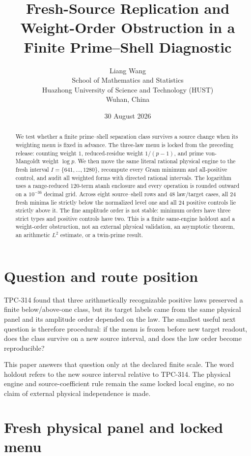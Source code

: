 \documentclass[10pt,a4paper]{article}
\title{Fresh-Source Replication and Weight-Order Obstruction in a Finite Prime--Shell Diagnostic}
\author{Liang Wang\\
School of Mathematics and Statistics\\
Huazhong University of Science and Technology (HUST)\\
Wuhan, China}
\date{30 August 2026}
\begin{document}
\maketitle

\begin{abstract}
We test whether a finite prime--shell separation class survives a source
change when its weighting menu is fixed in advance.  The three-law menu is
locked from the preceding release: counting weight $1$, reduced-residue
weight $1/(p-1)$, and prime von-Mangoldt weight $\log p$.  We then move the
same literal rational physical engine to the fresh interval
$I=\{641,\ldots,1280\}$, recompute every Gram minimum and all-positive
control, and audit all weighted forms with directed rational intervals.  The
logarithm uses a range-reduced 120-term atanh enclosure and every operation
is rounded outward on a $10^{-36}$ decimal grid.  Across eight source--shell
rows and 48 law/target cases, all 24 fresh minima lie strictly below the
normalized level one and all 24 positive controls lie strictly above it.  The
fine amplitude order is not stable: minimum orders have three strict types
and positive controls have two.  This is a finite same-engine holdout and a
weight-order obstruction, not an external physical validation, an asymptotic
theorem, an arithmetic $L^2$ estimate, or a twin-prime result.
\end{abstract}

\section{Question and route position}

TPC-314 found that three arithmetically recognizable positive laws preserved
a finite below/above-one class, but its target labels came from the same
physical panel and its amplitude order depended on the law.  The smallest
useful next question is therefore procedural: if the menu is frozen before
new target readout, does the class survive on a new source interval, and does
the law order become reproducible?

This paper answers that question only at the declared finite scale.  The word
holdout refers to the new source interval relative to TPC-314.  The physical
engine and source-coefficient rule remain the same locked local engine, so no
claim of external physical independence is made.

\section{Fresh physical panel and locked menu}
\end{document}
